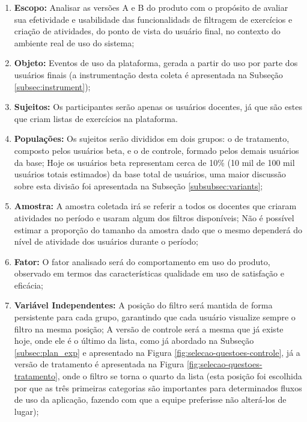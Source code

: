\begin{enumerate}
    \item \textbf{Escopo:} Analisar as versões A e B do produto com o propósito de avaliar sua efetividade e usabilidade das funcionalidads de filtragem de exercícios e criação de atividades, do ponto de vista do usuário final, no contexto do ambiente real de uso do sistema;
    
    \item \textbf{Objeto:} Eventos de uso da plataforma, gerada a partir do uso por parte dos usuários finais (a instrumentação desta coleta é apresentada na Subseção \ref{subsec:instrument});
    
    \item \textbf{Sujeitos:} Os participantes serão apenas os usuários docentes, já que são estes que criam listas de exercícios na plataforma. 
    
    \item \textbf{Populações:} Os sujeitos serão divididos em dois grupos: o de tratamento, composto pelos usuários beta, e o de controle, formado pelos demais usuários da base; Hoje os usuários beta representam cerca de 10\% (10 mil de 100 mil usuários totais estimados) da base total de usuários, uma maior discussão sobre esta divisão foi apresentada na Subseção \ref{subsubsec:variants};

    \item \textbf{Amostra:} A amostra coletada irá se referir a todos os docentes que criaram atividades no período e usaram algum dos filtros disponíveis; Não é possível estimar a proporção do tamanho da amostra dado que o mesmo dependerá do nível de atividade dos usuários durante o período;

    \item \textbf{Fator:} O fator analisado será do comportamento em uso do produto, observado em termos das características qualidade em uso de satisfação e eficácia;
    
    \item \textbf{Variável Independentes:} A posição do filtro será mantida de forma persistente para cada grupo, garantindo que cada usuário visualize sempre o filtro na mesma posição; A versão de controle será a mesma que já existe hoje, onde ele é o último da lista, como já abordado na Subseção \ref{subsec:plan_exp} e apresentado na Figura \ref{fig:selecao-questoes-controle}, já a versão de tratamento é apresentada na Figura \ref{fig:selecao-questoes-tratamento}, onde o filtro se torna o quarto da lista (esta posição foi escolhida por que as três primeiras categorias são importantes para determinados fluxos de uso da aplicação, fazendo com que a equipe preferisse não alterá-los de lugar);
    

\end{enumerate}
